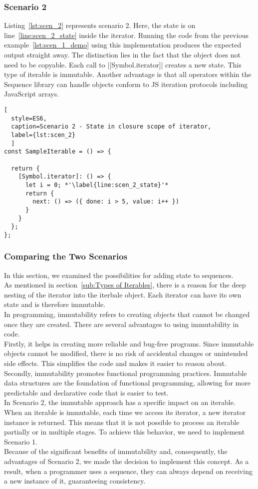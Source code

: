 \subsubsection{Scenario 2}
\label{subsub:Scenario 2}
Listing~\ref{lst:scen_2} represents scenario 2. Here, the state is on
line~\ref{line:scen_2_state} inside the iterator. Running the code from the
previous example~\ref{lst:scen_1_demo} using this implementation produces the
expected output straight away. The distinction lies in the fact that the object
does not need to be copyable. Each call to |[Symbol.iterator]| creates a new
state. This type of iterable is immutable. Another advantage is that all
operators within the Sequence library can handle objects conform to JS
iteration protocols including JavaScript arrays.

\begin{lstlisting}[
  style=ES6, 
  caption=Scenario 2 - State in closure scope of iterator,
  label={lst:scen_2}
  ]
const SampleIterable = () => {

  return {
    [Symbol.iterator]: () => {
      let i = 0; *'\label{line:scen_2_state}'*
      return {
        next: () => ({ done: i > 5, value: i++ })
      }
    }
  };
};
\end{lstlisting}


\subsubsection{Comparing the Two Scenarios}
\label{subsub:Comparing the Two Scenarios}
In this section, we examined the possibilities for adding state to 
sequences.\\
As mentioned in section~\ref{sub:Types of Iterables}, there is a reason for 
the deep nesting of the iterator into the iterbale object. 
Each iterator can have its own state and is therefore immutable.
\\
In programming, immutability refers to creating objects that cannot be changed
once they are created. There are several advantages to using immutability in
code.
\\
Firstly, it helps in creating more reliable and bug-free programs. Since
immutable objects cannot be modified, there is no risk of accidental changes or
unintended side effects. This simplifies the code and makes it easier to reason
about.
\\
Secondly, immutability promotes functional programming practices. Immutable
data structures are the foundation of functional programming, allowing for more
predictable and declarative code that is easier to test.
\\
In Scenario 2, the immutable approach has a specific impact on an iterable.
When an iterable is immutable, each time we access its iterator, a new iterator
instance is returned. This means that it is not possible to process an iterable
partially or in multiple stages. To achieve this behavior, we need to implement
Scenario 1.
\\
Because of the significant benefits of immutability and, consequently, the
advantages of Scenario 2, we made the decision to implement this concept. As a
result, when a programmer uses a sequence, they can always depend on receiving
a new instance of it, guaranteeing consistency.



